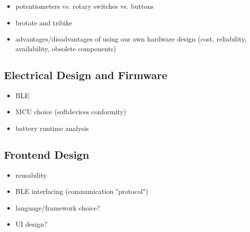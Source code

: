 \cite{gesturing_on_the_handlebars} \cite{no_need_to_stop} \cite{text_me_if_you_can} \cite{brotate_and_tribike}

\begin{itemize}
    \item potentiometers vs. rotary switches vs. buttons
    \item brotate and tribike \cite{brotate_and_tribike}
    \item advantages/disadvantages of using our own hardware design (cost, reliability, availability, obsolete components)
\end{itemize}

\subsection{Electrical Design and Firmware}

\begin{itemize}
    \item BLE
    \item MCU choice (softdevices conformity)
    \item battery runtime analysis
\end{itemize}

\subsection{Frontend Design}

\begin{itemize}
    \item reusability
    \item BLE interfacing (communication "protocol")
    \item language/framework choice?
    \item UI design?
\end{itemize}
